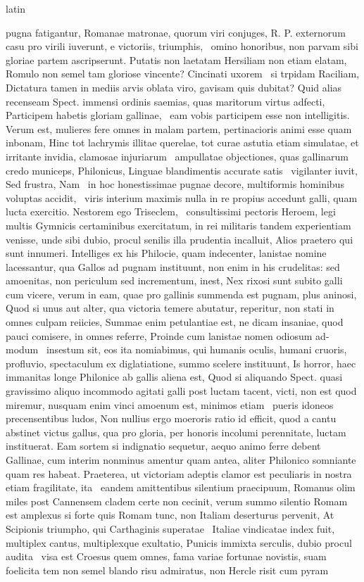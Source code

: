 \documentclass[12pt]{book}
\renewenvironment{latin}
    	{\begin{hyphenrules}{latin}}
    	{\end{hyphenrules}}
\begin{document}
\begin{pages}
\begin{latin}
\begin{Leftside}
pugna fatigantur, Romanae matronae, quorum viri conjuges, R. P. externorum casu pro virili iuverunt, e victoriis, triumphis, ﻿\ampersand\ omino honoribus, non parvam sibi gloriae partem ascripserunt. Putatis non laetatam Hersiliam non etiam elatam, Romulo non semel tam gloriose vincente? Cincinati uxorem ﻿\ampersand\ si trpidam Raciliam, Dictatura tamen in mediis arvis oblata viro, gavisam quis dubitat? Quid alias recenseam Spect. immensi ordinis saemias, quas maritorum virtus adfecti, Participem habetis gloriam gallinae, ﻿\ampersand\ eam vobis participem esse non intelligitis. Verum est, mulieres fere omnes in malam partem, pertinacioris animi esse quam inbonam, Hinc tot lachrymis illitae querelae, tot curae astutia etiam simulatae, et irritante invidia, clamosae injuriarum ﻿\ampersand\ ampullatae objectiones, quas gallinarum credo municeps, Philonicus, Linguae blandimentis accurate satis ﻿\ampersand\ vigilanter iuvit, Sed frustra, Nam ﻿\ampersand\ in hoc honestissimae pugnae decore, multiformis hominibus voluptas accidit, ﻿\ampersand\ viris interium maximis nulla in re propius accedunt galli, quam lucta exercitio. Nestorem ego Triseclem, ﻿\ampersand\ consultissimi pectoris Heroem, legi multis Gymnicis certaminibus exercitatum, in rei militaris tandem experientiam venisse, unde sibi dubio, procul senilis illa prudentia incalluit, Alios praetero qui sunt innumeri. Intelliges ex his Philocie, quam indecenter, lanistae nomine lacessantur, qua Gallos ad pugnam instituunt, non enim in his crudelitas: sed amoenitas, non periculum sed incrementum, inest, Nex rixosi sunt subito galli cum vicere, verum in eam, quae pro gallinis summenda est pugnam, plus aninosi, Quod si unus aut alter, qua victoria temere abutatur, reperitur, non stati in omnes culpam reiicies, Summae enim petulantiae est, ne dicam insaniae, quod pauci comisere, in omnes referre, Proinde cum lanistae nomen odiosum ad-   modum ﻿\ampersand\ insestum sit, eos ita nomiabimus, qui humanis oculis, humani cruoris, profluvio, spectaculum ex diglatiatione, summo scelere instituunt, Is horror, haec immanitas longe Philonice ab gallis aliena est, Quod si aliquando Spect. quasi gravissimo aliquo incommodo agitati galli post luctam tacent, victi, non est quod miremur, nusquam enim vinci amoenum est, minimos etiam ﻿\ampersand\ pueris idoneos precensentibus ludos, Non nullius ergo moeroris ratio id efficit, quod a cantu abstinet victus gallus, qua pro gloria, per honoris incolumi perennitate, luctam instituerat. Eam sortem si indignatio sequetur, aequo animo ferre debent Gallinae, cum interim nonminus amentur quam antea, aliter Philonico somniante quam res habeat. Praeterea, ut victoriam adeptis clamor est peculiaris in nostra etiam fragilitate, ita ﻿\ampersand\ eandem amittentibus silentium praecipuum, Romanus olim miles post Cannensem cladem certe non cecinit, verum summo silentio Romam est amplexus si forte quis Romam tunc, non Italiam deserturus pervenit, At Scipionis triumpho, qui Carthaginis superatae ﻿\ampersand\ Italiae vindicatae index fuit, multiplex cantus, multiplexque exultatio, Punicis immixta serculis, dubio procul audita ﻿\ampersand\ visa est Croesus quem omnes, fama variae fortunae novistis, suam foelicita tem non semel blando risu admiratus, non Hercle risit cum pyram 
\end{Leftside}
\end{latin}
\end{pages}
\end{document}
